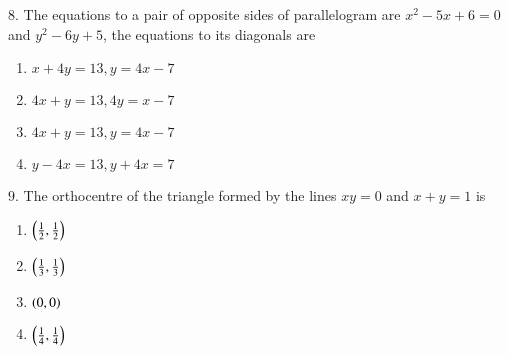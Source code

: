\documentclass[journal,12pt,twocolumn]{IEEEtran}
\theoremstyle{remark}
\begin{document}
$8$. The equations to a pair of opposite sides of parallelogram are $x^{2}-5x+6=0$ and $y^{2}-6y+5$, the equations to its diagonals are \hfill{}
\begin{enumerate}[label=\alph*]
    \item $x+4y=13,y=4x-7$
    \item $4x+y=13,4y=x-7$
    \item $4x+y=13,y=4x-7$
    \item $y-4x=13,y+4x=7$
\end{enumerate}
$9$. The orthocentre of the triangle formed by the lines $xy=0$ and $x+y=1$ is \hfill{}
\begin{enumerate}[label=\alph*]
    \item $\left(\frac{1}{2},\frac{1}{2}\right)$
    \item $\left(\frac{1}{3},\frac{1}{3}\right)$
    \item $\left(0,0\right)$
    \item $\left(\frac{1}{4},\frac{1}{4}\right)$
\end{enumerate}
\end{document}
